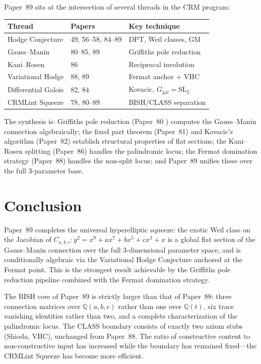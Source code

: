 \documentclass[11pt,a4paper]{article}
\theoremstyle{definition}
\theoremstyle{remark}
\newcommand{\QQ}{\mathbb{Q}}
\newcommand{\SL}{\mathrm{SL}}
\begin{document}
Paper~89 sits at the intersection of several threads in the CRM program:

\begin{center}
\begin{tabular}{@{}lll@{}}
\toprule
\textbf{Thread} & \textbf{Papers} & \textbf{Key technique} \\
\midrule
Hodge Conjecture & 49, 56--58, 84--89 & DPT, Weil classes, GM \\
Gauss--Manin & 80--85, 89 & Griffiths pole reduction \\
Kani--Rosen & 86 & Reciprocal involution \\
Variational Hodge & 88, 89 & Fermat anchor + VHC \\
Differential Galois & 82, 84 & Kovacic, $G_{\mathrm{gal}} = \SL_2$ \\
CRMLint Squeeze & 78, 80--89 & BISH/CLASS separation \\
\bottomrule
\end{tabular}
\end{center}

\noindent
The synthesis is: Griffiths pole reduction (Paper~80 \cite{Lee2025P80}) computes the
Gauss--Manin connection algebraically; the fixed part theorem (Paper~81)
and Kovacic's algorithm (Paper~82) establish structural properties of
flat sections; the Kani--Rosen splitting (Paper~86) handles the
palindromic locus; the Fermat domination strategy (Paper~88) handles
the non-split locus; and Paper~89 unifies these over the full 3-parameter
base.


\section{Conclusion}

Paper~89 completes the universal hyperelliptic squeeze: the exotic Weil
class on the Jacobian of $C_{a,b,c}: y^2 = x^9 + ax^7 + bx^5 + cx^3 + x$
is a global flat section of the Gauss--Manin connection over the full
3-dimensional parameter space, and is conditionally algebraic via the
Variational Hodge Conjecture anchored at the Fermat point.
This is the strongest result achievable by the Griffiths pole reduction
pipeline combined with the Fermat domination strategy.

The BISH core of Paper~89 is strictly larger than that of Paper~88:
three connection matrices over $\QQ(a,b,c)$ rather than one over $\QQ(t)$,
six trace vanishing identities rather than two, and a complete
characterization of the palindromic locus.
The CLASS boundary consists of exactly two axiom stubs (Shioda, VHC),
unchanged from Paper~88.
The ratio of constructive content to non-constructive input has increased
while the boundary has remained fixed---the CRMLint Squeeze has become
more efficient.
\end{document}
